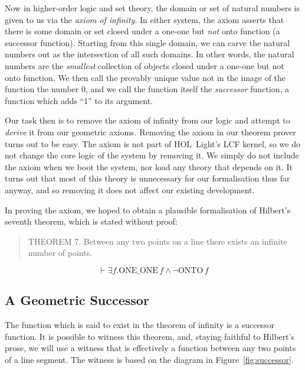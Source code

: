 Now in higher-order logic and set theory, the domain or set of natural numbers is given to us via the \emph{axiom of infinity}. In either system, the axiom asserts that there is some domain or set closed under a one-one but \emph{not} onto function (a successor function). Starting from this single domain, we can carve the natural numbers out as the intersection of all such domains. In other words, the natural numbers are the \emph{smallest} collection of objects closed under a one-one but not onto function. We then call the provably unique value not in the image of the function the number $0$, and we call the function itself the \emph{successor} function, a function which adds ``1'' to its argument.

Our task then is to remove the axiom of infinity from our logic and attempt to \emph{derive} it from our geometric axioms. Removing the axiom in our theorem prover turns out to be easy. The axiom is not part of HOL~Light's LCF kernel, so we do not change the core logic of the system by removing it. We simply do not include the axiom when we boot the system, nor load any theory that depends on it. It turns out that most of this theory is unnecessary for our formalisation thus far anyway, and so removing it does not affect our existing development.

In proving the axiom, we hoped to obtain a plausible formalisation of Hilbert's seventh theorem, which is stated without proof:

\begin{quote}\label{theorem:Theorem7}
THEOREM 7. Between any two points on a line there exists an infinite number of points.
\end{quote}

\begin{displaymath}
\vdash \exists f. \text{ONE\_ONE}\,f \wedge \neg\text{ONTO}\,f
\end{displaymath}

\subsection{A Geometric Successor}
The function which is said to exist in the theorem of infinity is a successor function. It is possible to  witness this theorem, and, staying faithful to Hilbert's prose, we will use a witness that is effectively a function between any two points of a line segment. The witness is based on the diagram in Figure~\ref{fig:successor}.

